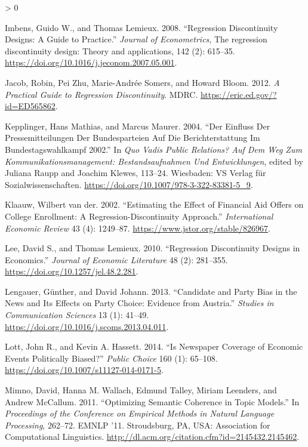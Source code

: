 \documentclass[
  12pt,
]{article}
\newlength{\cslhangindent}
\newenvironment{CSLReferences}[2] %
 {%
  \setlength{\parindent}{0pt}
  \ifodd #1 \everypar{\setlength{\hangindent}{\cslhangindent}}\ignorespaces\fi
  \ifnum #2 > 0
  \setlength{\parskip}{#2\baselineskip}
  \fi
 }%
 {}
\begin{document}
\begin{CSLReferences}{1}{0}
\leavevmode\hypertarget{ref-imbens_regression_2008}{}%
Imbens, Guido W., and Thomas Lemieux. 2008. {``Regression Discontinuity
Designs: A Guide to Practice.''} \emph{Journal of Econometrics}, The
regression discontinuity design: Theory and applications, 142 (2):
615--35. \url{https://doi.org/10.1016/j.jeconom.2007.05.001}.

\leavevmode\hypertarget{ref-jacob_practical_2012}{}%
Jacob, Robin, Pei Zhu, Marie-Andrée Somers, and Howard Bloom. 2012.
\emph{A Practical Guide to Regression Discontinuity}. {MDRC}.
\url{https://eric.ed.gov/?id=ED565862}.

\leavevmode\hypertarget{ref-kepplinger_einfluss_2004}{}%
Kepplinger, Hans Mathias, and Marcus Maurer. 2004. {``Der Einfluss Der
Pressemitteilungen Der Bundesparteien Auf Die Berichterstattung Im
Bundestagswahlkampf 2002.''} In \emph{Quo Vadis Public Relations? Auf
Dem Weg Zum Kommunikationsmanagement: Bestandsaufnahmen Und
Entwicklungen}, edited by Juliana Raupp and Joachim Klewes, 113--24.
Wiesbaden: {VS} Verlag für Sozialwissenschaften.
\url{https://doi.org/10.1007/978-3-322-83381-5_9}.

\leavevmode\hypertarget{ref-van_der_klaauw_estimating_2002}{}%
Klaauw, Wilbert van der. 2002. {``Estimating the Effect of Financial Aid
Offers on College Enrollment: A Regression-Discontinuity Approach.''}
\emph{International Economic Review} 43 (4): 1249--87.
\url{https://www.jstor.org/stable/826967}.

\leavevmode\hypertarget{ref-lee_regression_2010}{}%
Lee, David S., and Thomas Lemieux. 2010. {``Regression Discontinuity
Designs in Economics.''} \emph{Journal of Economic Literature} 48 (2):
281--355. \url{https://doi.org/10.1257/jel.48.2.281}.

\leavevmode\hypertarget{ref-lengauer_candidate_2013}{}%
Lengauer, Günther, and David Johann. 2013. {``Candidate and Party Bias
in the News and Its Effects on Party Choice: Evidence from Austria.''}
\emph{Studies in Communication Sciences} 13 (1): 41--49.
\url{https://doi.org/10.1016/j.scoms.2013.04.011}.

\leavevmode\hypertarget{ref-lott_is_2014}{}%
Lott, John R., and Kevin A. Hassett. 2014. {``Is Newspaper Coverage of
Economic Events Politically Biased?''} \emph{Public Choice} 160 (1):
65--108. \url{https://doi.org/10.1007/s11127-014-0171-5}.

\leavevmode\hypertarget{ref-mimno_optimizing_2011}{}%
Mimno, David, Hanna M. Wallach, Edmund Talley, Miriam Leenders, and
Andrew McCallum. 2011. {``Optimizing Semantic Coherence in Topic
Models.''} In \emph{Proceedings of the Conference on Empirical Methods
in Natural Language Processing}, 262--72. {EMNLP} '11. Stroudsburg,
{PA}, {USA}: Association for Computational Linguistics.
\url{http://dl.acm.org/citation.cfm?id=2145432.2145462}.


\end{CSLReferences}
\end{document}
